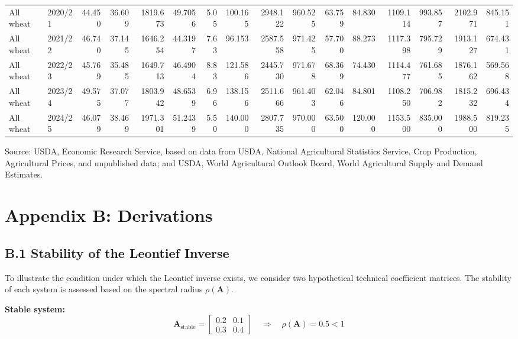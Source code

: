 \documentclass[12pt,a4paper]{article}%
\begin{document}
\begin{landscape}
\begin{table}[ht]
{\begin{tabular}{llrrrrrrrrrrrrrr}
All wheat & 2020/21 & 44.450 & 36.609 & 1819.673 & 49.7056 & 5.05 & 100.165 & 2948.122 & 960.525 & 63.759 & 84.830 & 1109.114 & 993.857 & 2102.971 & 845.151 \\
All wheat & 2021/22 & 46.740 & 37.145 & 1646.254 & 44.3197 & 7.63 & 96.153 & 2587.558 & 971.425 & 57.700 & 88.273 & 1117.398 & 795.729 & 1913.127 & 674.431 \\
All wheat & 2022/23 & 45.769 & 35.485 & 1649.713 & 46.4904 & 8.83 & 121.586 & 2445.730 & 971.678 & 68.369 & 74.430 & 1114.477 & 761.685 & 1876.162 & 569.568 \\
All wheat & 2023/24 & 49.575 & 37.077 & 1803.942 & 48.6539 & 6.96 & 138.156 & 2511.666 & 961.403 & 62.046 & 84.801 & 1108.250 & 706.982 & 1815.232 & 696.434 \\
All wheat & 2024/25 & 46.079 & 38.469 & 1971.301 & 51.2439 & 5.50 & 140.000 & 2807.735 & 970.000 & 63.500 & 120.000 & 1153.500 & 835.000 & 1988.500 & 819.235 \\
\bottomrule
\end{tabular}%
}
\raggedright

\vspace{0.3cm}
\footnotesize{Source: USDA, Economic Research Service, based on data from USDA, National Agricultural Statistics Service, Crop Production, Agricultural Prices, and unpublished data; and USDA, World Agricultural Outlook Board, World Agricultural Supply and Demand Estimates. }
\end{table}
\end{landscape}



\newpage
\section*{Appendix B: Derivations}
\subsection*{B.1 Stability of the Leontief Inverse}

To illustrate the condition under which the Leontief inverse exists, we consider two hypothetical technical coefficient matrices. The stability of each system is assessed based on the spectral radius \( \rho(\mathbf{A}) \).

\textbf{Stable system:}
\[
\mathbf{A}_{\text{stable}} =
\begin{bmatrix}
0.2 & 0.1 \\
0.3 & 0.4
\end{bmatrix}
\quad \Rightarrow \quad \rho(\mathbf{A}) = 0.5 < 1
\]
\end{document}
